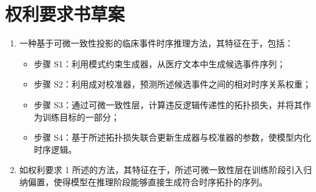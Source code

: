 \documentclass[a4paper,12pt]{article}
\begin{document}
\section{权利要求书草案}

\begin{enumerate}
    \item 一种基于可微一致性投影的临床事件时序推理方法，其特征在于，包括：
    \begin{itemize}
        \item 步骤 S1：利用模式约束生成器，从医疗文本中生成候选事件序列；
        \item 步骤 S2：利用成对校准器，预测所述候选事件之间的相对时序关系权重；
        \item 步骤 S3：通过可微一致性层，计算违反逻辑传递性的拓扑损失，并将其作为训练目标的一部分；
        \item 步骤 S4：基于所述拓扑损失联合更新生成器与校准器的参数，使模型内化时序逻辑。
    \end{itemize}
    \item 如权利要求 1 所述的方法，其特征在于，所述可微一致性层在训练阶段引入归纳偏置，使得模型在推理阶段能够直接生成符合时序拓扑的序列。
\end{enumerate}
\end{document}
